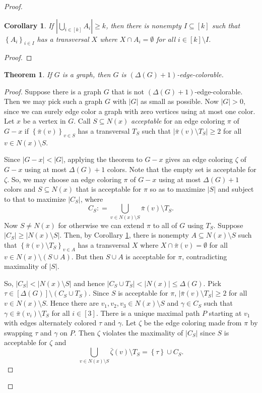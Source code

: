\documentclass{amsbook}
\theoremstyle{plain}
\newtheorem{corollary}{Corollary}
\newtheorem{theorem}{Theorem}
\numberwithin{equation}{chapter}
\newcommand{\set}[1]{\left\{ #1 \right\}}
\newcommand{\card}[1]{\left|#1\right|}
\newcommand{\irange}[1]{\left[#1\right]}
\newcommand{\parens}[1]{\left( #1 \right)}
\newcommand{\DefinedAs}{\mathrel{\mathop:}=}
\begin{document}
\begin{proof}
\begin{corollary}\label{TransversalCorollary}
If $\card{\bigcup_{i \in \irange{k}} A_i} \ge k$, then there is nonempty $I \subseteq \irange{k}$ such that $\set{A_i}_{i \in I}$ has a transversal $X$ where $X \cap A_i = \emptyset$
for all $i \in \irange{k} \setminus I$.
\end{corollary}
\begin{proof}
\end{proof}

\begin{theorem}
If $G$ is a graph, then $G$ is $\parens{\Delta(G) + 1}$-edge-colorable.
\end{theorem}
\begin{proof}
Suppose there is a graph $G$ that is not $(\Delta(G) + 1)$-edge-colorable.  Then we may pick such a graph $G$ with $\card{G}$ as small as possible.
Now $\card{G} > 0$, since we can surely edge color a graph with zero vertices using at most one color. Let $x$ be a vertex in $G$.   Call $S\subseteq N(x)$ \emph{acceptable} for 
an edge coloring $\pi$ of $G-x$ if $\set{\bar{\pi}(v)}_{v \in S}$ has a transversal $T_S$ such that $\card{\bar{\pi}(v) \setminus T_S} \ge 2$ for all $v \in N(x)\setminus S$.

Since $\card{G-x} < \card{G}$, applying the theorem to $G-x$ gives an edge coloring $\zeta$ of $G-x$ using at most $\Delta(G) + 1$ colors. 
Note that the empty set is acceptable for $\zeta$.  So, we may choose an edge coloring $\pi$ of $G-x$ using at most $\Delta(G) + 1$ colors and $S\subseteq N(x)$ 
that is acceptable for $\pi$ so as to maximize $\card{S}$ and subject to that to maximize $\card{C_S}$, where
\[C_S \DefinedAs \bigcup_{v \in N(x) \setminus S} \bar{\pi}(v) \setminus T_S.\]
Now $S \neq N(x)$ for otherwise we can extend $\pi$ to all of $G$ using $T_S$.  Suppose $\card{C_S}\ge \card{N(x) \setminus S}$.
Then, by Corollary \ref{TransversalCorollary}, there is nonempty $A \subseteq N(x) \setminus S$ such that $\set{\bar{\pi}(v)\setminus T_S}_{v \in A}$ has
a transversal $X$ where $X \cap \bar{\pi}(v) = \emptyset$ for all $v \in N(x) \setminus \parens{S \cup A}$.  But then $S\cup A$ is acceptable for $\pi$, contradicting
maximality of $\card{S}$.  

So, $\card{C_S}< \card{N(x) \setminus S}$ and hence $\card{C_S \cup T_S} < \card{N(x)} \le \Delta(G)$.  
Pick $\tau \in \irange{\Delta(G)} \setminus \parens{C_S \cup T_S}$.  Since $S$ is acceptable for $\pi$, $\card{\bar{\pi}(v) \setminus T_S} \ge 2$ for all $v \in N(x)\setminus S$.
Hence there are $v_1, v_2, v_3 \in N(x)\setminus S$ and $\gamma \in C_S$ such that $\gamma \in \bar{\pi}(v_i) \setminus T_S$ for all $i \in \irange{3}$.
There is a unique maximal path $P$ starting at $v_1$ with edges alternately colored $\tau$ and $\gamma$.  
Let $\zeta$ be the edge coloring made from $\pi$ by swapping $\tau$ and $\gamma$ on $P$.  Then $\zeta$ violates the maximality of $\card{C_S}$ since $S$ is acceptable for $\zeta$ and
\[\bigcup_{v \in N(x) \setminus S} \bar{\zeta}(v) \setminus T_S = \set{\tau} \cup C_S.\]


\end{proof}
\end{proof}
\end{document}
